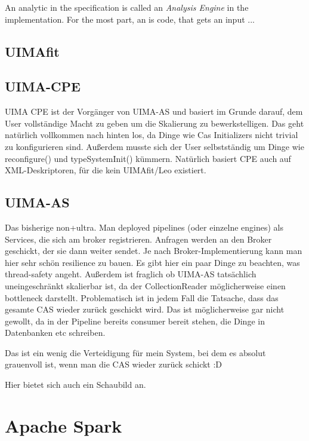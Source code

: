 An analytic in the \uima{} specification is called an \emph{Analysis Engine} in the implementation. For the most part, an \anen{} is code, that gets an input \cas{} ...


\subsection{UIMAfit}
\subsection{UIMA-CPE}
UIMA CPE ist der Vorgänger von UIMA-AS und basiert im Grunde darauf, dem User vollständige Macht zu geben um die Skalierung zu bewerkstelligen. Das geht natürlich vollkommen nach hinten los, da Dinge wie Cas Initializers nicht trivial zu konfigurieren sind. Außerdem musste sich der User selbstständig um Dinge wie reconfigure() und typeSystemInit() kümmern. 
Natürlich basiert CPE auch auf XML-Deskriptoren, für die kein UIMAfit/Leo existiert.

\subsection{UIMA-AS}
Das bisherige non+ultra. Man deployed pipelines (oder einzelne engines) als Services, die sich am broker registrieren. Anfragen werden an den Broker geschickt, der sie dann weiter sendet. Je nach Broker-Implementierung kann man hier sehr schön resilience zu bauen. Es gibt hier ein paar Dinge zu beachten, was thread-safety angeht. Außerdem ist fraglich ob UIMA-AS tatsächlich uneingeschränkt skalierbar ist, da der CollectionReader möglicherweise einen bottleneck darstellt. Problematisch ist in jedem Fall die Tatsache, dass das gesamte CAS wieder zurück geschickt wird. Das ist möglicherweise gar nicht gewollt, da in der Pipeline bereits consumer bereit stehen, die Dinge in Datenbanken etc schreiben.

Das ist ein wenig die Verteidigung für mein System, bei dem es absolut grauenvoll ist, wenn man die CAS wieder zurück schickt :D

Hier bietet sich auch ein Schaubild an.

\section{Apache Spark}


